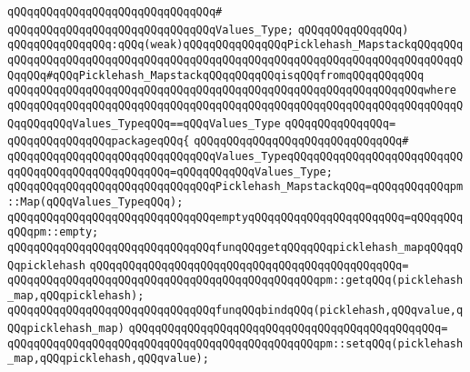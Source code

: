 \verb|qQQqqQQqqQQqqQQqqQQqqQQqqQQqqQQq#|\newline
\verb|qQQqqQQqqQQqqQQqqQQqqQQqqQQqqQQqValues_Type;|\newline
\verb|qQQqqQQqqQQqqQQq)|\newline
\verb|qQQqqQQqqQQqqQQq:qQQq(weak)qQQqqQQqqQQqqQQqPicklehash_MapstackqQQqqQQqqQQqqQQqqQQqqQQqqQQqqQQqqQQqqQQqqQQqqQQqqQQqqQQqqQQqqQQqqQQqqQQqqQQqqQQqqQQq#qQQqPicklehash_MapstackqQQqqQQqqQQqisqQQqfromqQQqqQQqqQQq|\newline
\verb|qQQqqQQqqQQqqQQqqQQqqQQqqQQqqQQqqQQqqQQqqQQqqQQqqQQqqQQqqQQqqQQqwhere|\newline
\verb|qQQqqQQqqQQqqQQqqQQqqQQqqQQqqQQqqQQqqQQqqQQqqQQqqQQqqQQqqQQqqQQqqQQqqQQqqQQqqQQqValues_TypeqQQq==qQQqValues_Type|\newline
\verb|qQQqqQQqqQQqqQQq=|\newline
\verb|qQQqqQQqqQQqqQQqpackageqQQq{|\newline
\verb|qQQqqQQqqQQqqQQqqQQqqQQqqQQqqQQq#|\newline
\verb|qQQqqQQqqQQqqQQqqQQqqQQqqQQqqQQqValues_TypeqQQqqQQqqQQqqQQqqQQqqQQqqQQqqQQqqQQqqQQqqQQqqQQqqQQq=qQQqqQQqqQQqValues_Type;|\newline
\verb|qQQqqQQqqQQqqQQqqQQqqQQqqQQqqQQqPicklehash_MapstackqQQq=qQQqqQQqqQQqpm::Map(qQQqValues_TypeqQQq);|\newline
\newline
\verb|qQQqqQQqqQQqqQQqqQQqqQQqqQQqqQQqemptyqQQqqQQqqQQqqQQqqQQqqQQq=qQQqqQQqqQQqpm::empty;|\newline
\newline
\newline
\newline
\verb|qQQqqQQqqQQqqQQqqQQqqQQqqQQqqQQqfunqQQqgetqQQqqQQqpicklehash_mapqQQqqQQqpicklehash|\newline
\verb|qQQqqQQqqQQqqQQqqQQqqQQqqQQqqQQqqQQqqQQqqQQqqQQq=|\newline
\verb|qQQqqQQqqQQqqQQqqQQqqQQqqQQqqQQqqQQqqQQqqQQqqQQqpm::getqQQq(picklehash_map,qQQqpicklehash);|\newline
\newline
\newline
\verb|qQQqqQQqqQQqqQQqqQQqqQQqqQQqqQQqfunqQQqbindqQQq(picklehash,qQQqvalue,qQQqpicklehash_map)|\newline
\verb|qQQqqQQqqQQqqQQqqQQqqQQqqQQqqQQqqQQqqQQqqQQqqQQq=|\newline
\verb|qQQqqQQqqQQqqQQqqQQqqQQqqQQqqQQqqQQqqQQqqQQqqQQqpm::setqQQq(picklehash_map,qQQqpicklehash,qQQqvalue);|\newline
